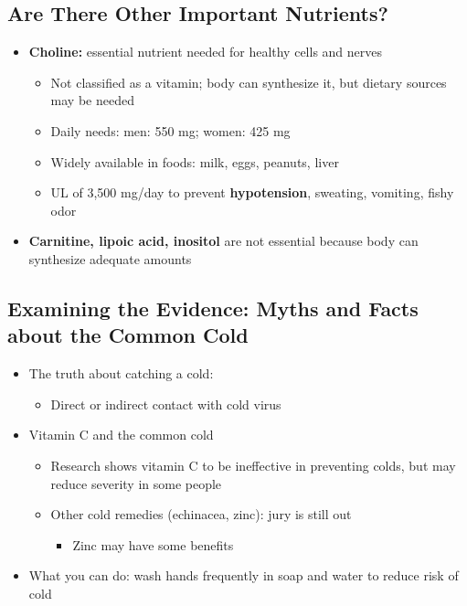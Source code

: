 \documentclass[12pt]{article}
\begin{document}
        \subsection{Are There Other Important Nutrients?}
            \begin{itemize}
                \item \textbf{Choline:} essential nutrient needed for healthy cells and nerves
                    \begin{itemize}
                        \item Not classified as a vitamin; body can synthesize it, but dietary sources may be needed
                        \item Daily needs: men: 550 mg; women: 425 mg
                        \item Widely available in foods: milk, eggs, peanuts, liver
                        \item UL of 3,500 mg/day to prevent \textbf{hypotension}, sweating, vomiting, fishy odor
                    \end{itemize}
                \item \textbf{Carnitine, lipoic acid, inositol} are not essential because body can synthesize adequate amounts
            \end{itemize}

        \subsection{Examining the Evidence: Myths and Facts about the Common Cold}
            \begin{itemize}
                \item The truth about catching a cold:
                    \begin{itemize}
                        \item Direct or indirect contact with cold virus
                    \end{itemize}
                \item Vitamin C and the common cold
                    \begin{itemize}
                        \item Research shows vitamin C to be ineffective in preventing colds, but may reduce severity in some people
                        \item Other cold remedies (echinacea, zinc): jury is still out
                            \begin{itemize}
                                \item Zinc may have some benefits
                            \end{itemize}
                    \end{itemize}
                \item What you can do: wash hands frequently in soap and water to reduce risk of cold
            \end{itemize}
\end{document}
